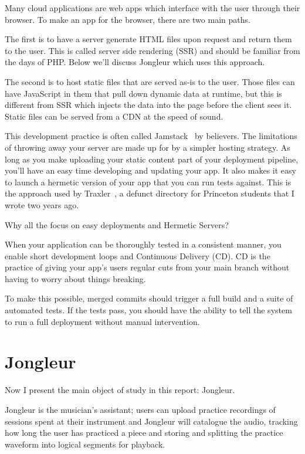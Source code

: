 \documentclass{article}
\newcommand{\infobox}[2]{
  \begin{tcolorbox}[width=\textwidth,colback={white},title={\strut\textbf{#1}},colbacktitle=blue!15,coltitle=black,boxrule=0.2pt,parbox=false]
    #2
  \end{tcolorbox}
}
\begin{document}
Many cloud applications are web apps which interface with the user through their browser.
To make an app for the browser, there are two main paths.

The first is to have a server generate HTML files upon request and return them to the user.
This is called server side rendering (SSR) and should be familiar from the days of PHP.
Below we'll discuss Jongleur which uses this approach.

The second is to host static files that are served as-is to the user.
Those files can have JavaScript in them that pull down dynamic data at runtime, but this is different from SSR which injects the data into the page before the client sees it.
Static files can be served from a CDN at the speed of sound.

This development practice is often called Jamstack~\cite{jamstack} by believers.
The limitations of throwing away your server are made up for by a simpler hosting strategy.
As long as you make uploading your static content part of your deployment pipeline, you'll have an easy time developing and updating your app.
It also makes it easy to launch a hermetic version of your app that you can run tests against.
This is the approach used by Traxler~\cite{traxler}, a defunct directory for Princeton students that I wrote two years ago.

\infobox{Continuous delivery}{
  Why all the focus on easy deployments and Hermetic Servers?
  
  When your application can be thoroughly tested in a consistent manner, you enable short development loops and Continuous Delivery (CD).
  CD is the practice of giving your app's users regular cuts from your main branch without having to worry about things breaking.

  To make this possible, merged commits should trigger a full build and a suite of automated tests.
  If the tests pass, you should have the ability to tell the system to run a full deployment without manual intervention.
}

\section{Jongleur}
\label{JONG}

Now I present the main object of study in this report: Jongleur.

Jongleur is the musician's assistant; users can upload practice recordings of sessions spent at their instrument and Jongleur will catalogue the audio, tracking how long the user has practiced a piece and storing and splitting the practice waveform into logical segments for playback.
\end{document}
